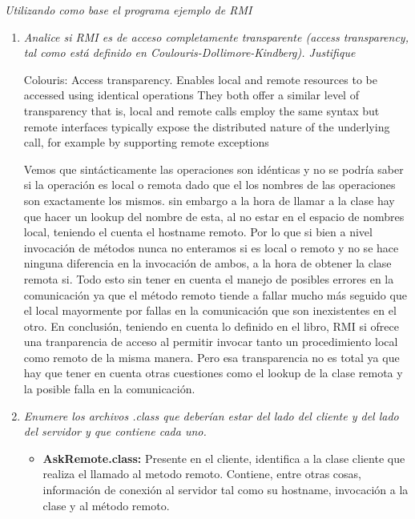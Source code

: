 \documentclass[12pt,journal,compsoc]{IEEEtran}
\begin{document}
\textit{Utilizando como base el programa ejemplo de RMI}
\begin{enumerate}[label=\alph* -]
  \item \textit{Analice si RMI es de acceso completamente
  transparente (access transparency, tal como está definido en
  Coulouris-Dollimore-Kindberg). Justifique}

  Colouris:
     Access transparency. Enables local and remote resources to be
     accessed using identical operations They both offer a similar level
     of transparency that is, local and remote calls employ the same
     syntax but remote interfaces typically expose the distributed nature
     of the underlying call, for example by supporting remote exceptions

  Vemos que sintácticamente las operaciones son idénticas y no se podría
  saber si la operación es local o remota dado que el los nombres de las
  operaciones son exactamente los mismos. sin embargo a la hora de llamar
  a la clase hay que hacer un lookup del nombre de esta, al no estar en
  el espacio de nombres local, teniendo el cuenta el hostname remoto.
  Por lo que si bien a nivel invocación de métodos nunca no enteramos si
  es local o remoto y no se hace ninguna diferencia en la invocación de
  ambos, a la hora de obtener la clase remota si. Todo esto sin tener en
  cuenta el manejo de posibles errores en la comunicación ya que el método
  remoto tiende a fallar mucho más seguido que el local mayormente por fallas
  en la comunicación que son inexistentes en el otro.
  En conclusión, teniendo en cuenta lo definido en el libro, RMI si ofrece
  una tranparencia de acceso al permitir invocar tanto un procedimiento
  local como remoto de la misma manera. Pero esa transparencia no es total
  ya que hay que tener en cuenta otras cuestiones como el lookup de la clase
  remota y la posible falla en la comunicación.\\

  \item \textit{Enumere los archivos .class que deberían estar del lado
  del cliente y del lado del servidor y que contiene cada uno.}

  \begin{itemize}
    \item \textbf{AskRemote.class:} Presente en el cliente, identifica a
    la clase cliente que realiza el llamado al metodo remoto. Contiene,
    entre otras cosas, información de conexión al servidor tal como su
    hostname, invocación a la clase y al método remoto.\\


\end{itemize}
\end{enumerate}
\end{document}
